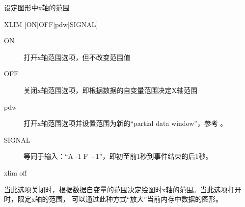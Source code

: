 \label{cmd:xlim}

设定图形中x轴的范围

\begin{SACSTX}
XLIM [ON|OFF|pdw|SIGNAL]
\end{SACSTX}

\begin{description}
\item [ON] 打开x轴范围选项，但不改变范围值
\item [OFF] 关闭x轴范围选项，即根据数据的自变量范围决定X轴范围
\item [pdw] 打开x轴范围选项并设置范围为新的``partial data window''，参考 。
\item [SIGNAL] 等同于输入：``A -1 F +1''，即初至前1秒到事件结束的后1秒。
\end{description}

\begin{SACDFT}
xlim off
\end{SACDFT}

当此选项关闭时，根据数据自变量的范围决定绘图时x轴的范围。当此选项打开时，限定x轴的范围，
可以通过此种方式``放大''当前内存中数据的图形。
